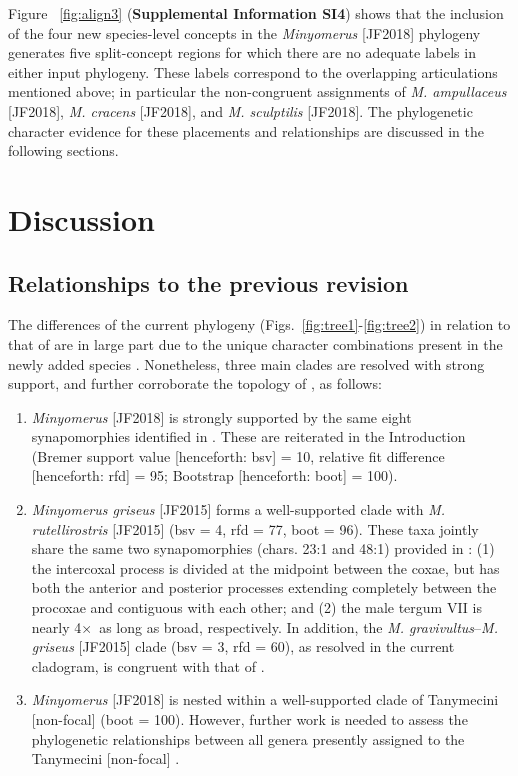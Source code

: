 \documentclass[fleqn,10pt,lineno]{wlpeerj} %
\newcommand{\x}{$\times$~}
\begin{document}
	Figure ~\ref{fig:align3} (\textbf{Supplemental Information SI4}) shows that the inclusion of the four new species-level concepts in the \textit{Minyomerus} [JF2018] phylogeny generates five split-concept regions for which there are no adequate labels in either input phylogeny.
	These labels correspond to the overlapping articulations mentioned above; in particular the non-congruent assignments of \textit{M. ampullaceus} [JF2018], \textit{M. cracens} [JF2018], and \textit{M. sculptilis} [JF2018].
	The phylogenetic character evidence for these placements and relationships are discussed in the following sections.

\section*{Discussion}\label{sec:disc}
	\subsection*{Relationships to the previous revision}\label{ssec:same}
		The differences of the current phylogeny (Figs.~\ref{fig:tree1}-\ref{fig:tree2}) in relation to that of \citet{jansen2015} are in large part due to the unique character combinations present in the newly added species \citep{rieppel2007, franz2014}.
		Nonetheless, three main clades are resolved with strong support, and further corroborate the topology of \citet{jansen2015}, as follows:
		\begin{enumerate}
			\item \textit{Minyomerus} [JF2018] is strongly supported by the same eight synapomorphies identified in \citet{jansen2015}. These are reiterated in the Introduction (Bremer support value [henceforth: bsv] = 10, relative fit difference [henceforth: rfd] = 95; Bootstrap [henceforth: boot] = 100).
			\item \textit{Minyomerus griseus} [JF2015] forms a well-supported clade with \textit{M. rutellirostris} [JF2015] (bsv = 4, rfd = 77, boot = 96). These taxa jointly share the same two synapomorphies (chars. 23:1 and 48:1) provided in \citet{jansen2015}: (1) the intercoxal process is divided at the midpoint between the coxae, but has both the anterior and posterior processes extending completely between the procoxae and contiguous with each other; and (2) the male tergum VII is nearly 4\x as long as broad, respectively. In addition, the \textit{M. gravivultus}--\textit{M. griseus} [JF2015] clade (bsv = 3, rfd = 60), as resolved in the current cladogram, is congruent with that of \citet{jansen2015}.
			\item \textit{Minyomerus} [JF2018] is nested within a well-supported clade of Tanymecini [non-focal] (boot = 100). However, further work is needed to assess the phylogenetic relationships between all genera presently assigned to the Tanymecini [non-focal] \citep{alonso1999}.
		\end{enumerate}
	
\end{document}
